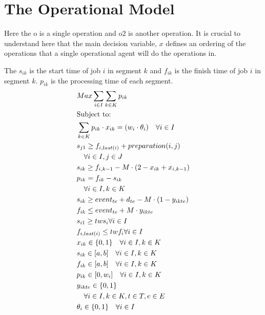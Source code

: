 \section{The Operational Model}

Here the o is a single operation and o2 is another operation. It is crucial to understand here that the main
decision variable, $x$ defines an ordering of the operations that a single operational agent will do the 
operations in. 

The $s_{ik}$ is the start time of job $i$ in segment $k$ and $f_{ik}$ is the finish time of job $i$ in segment $k$.
$p_{ik}$ is the processing time of each segment. 
\begin{alignat}{2}
	&Max \sum_{i \in I} \sum_{k \in K} p_{ik} \\
	&\text{Subject to:} \notag \\
    &\sum_{k \in K} p_{ik} \cdot x_{ik} = (w_i \cdot \theta_i) \quad \forall i \in I \\
	&s_{j1} \geq f_{i,last(i)} + preparation(i, j) \notag \\ 
	&\quad \forall i \in I, j \in J\\
	&s_{ik} \geq f_{i,k-1} - M \cdot (2 - x_{ik} + x_{i,k-1}) \\
	&p_{ik} = f_{ik} - s_{ik} \\
	&\quad \forall i \in I, k \in K \notag\\
	&s_{ik} \geq event_{te} + d_{te} - M \cdot (1 - y_{ikte}) \\ 
	&f_{ik} \leq event_{te} + M \cdot y_{ikte} \\ 
	&s_{i1} \geq tws_i \forall i \in I \\
	&f_{i,last(i)} \leq twf_i \forall i \in I \\
	&x_{ik} \in \{0, 1\} \quad \forall i \in I, k \in K\\
	&s_{ik} \in [a, b] \quad \forall i \in I, k \in K\\
	&f_{ik} \in [a, b] \quad \forall i \in I, k \in K\\
	&p_{ik} \in [0, w_i] \quad \forall i \in I, k \in K \\
	&y_{ikte} \in \{0, 1\} \\ 
	&\quad \forall i \in I, k \in K, t \in T, e \in E \notag \\
	&\theta_i \in \{0, 1\} \quad \forall i \in I \\
\end{alignat}
